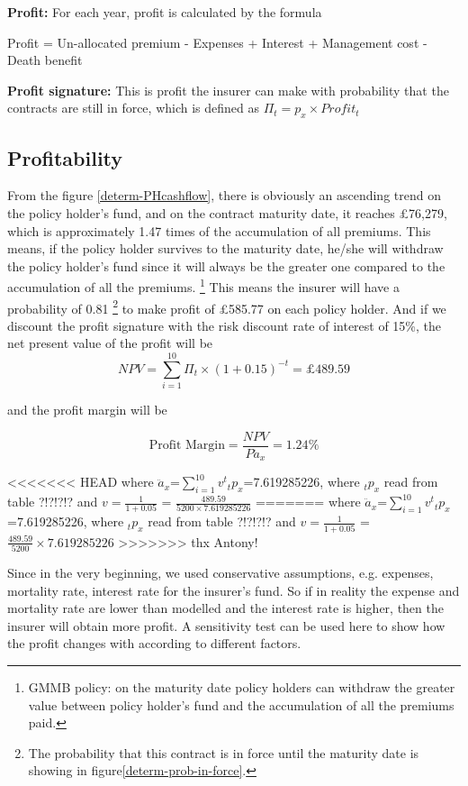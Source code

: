\documentclass{report}
\begin{document}
\textbf{Profit:} For each year, profit is calculated by the formula

Profit = Un-allocated premium - Expenses + Interest + Management cost - Death benefit

\textbf{Profit signature:} This is profit the insurer can make with probability that the contracts are still in force, which is defined as $\Pi_t = p_x \times Profit_t$


\subsection{Profitability}


From the figure \ref{determ-PHcashflow}, there is obviously an ascending trend on the policy holder's fund, and on the contract maturity date, it reaches \pounds 76,279, which is approximately 1.47 times of the accumulation of all premiums. This means, if the policy holder survives to the maturity date, he/she will withdraw the policy holder's fund since it will always be the greater one compared to the accumulation of all the premiums. \footnote{GMMB policy: on the maturity date policy holders can withdraw the greater value between policy holder's fund and the accumulation of all the premiums paid.} This means the insurer will have a probability of 0.81 \footnote{The probability that this contract is in force until the maturity date is showing in figure\ref{determ-prob-in-force}.} to make profit of \pounds 585.77 on each policy holder. And if we discount the profit signature with the risk discount rate of interest of 15\%, the net present value of the profit will be 
\[
 NPV=\sum_{i=1}^{10} \Pi_t \times (1+0.15)^{-t} = \pounds 489.59
\]
 
and the profit margin will be


\[
\text{Profit\ Margin} =  \frac{NPV}{P \ddot{a}_x} = 1.24\%
\]

<<<<<<< HEAD
where $\ddot{a}_x$=$\sum_{i=1}^{10} v^t {_tp_x}$=7.619285226, where $_tp_x$
read from table ?!?!?!? and $v=\frac{1}{1+0.05}$  = $\frac{489.59}{5200 \times
7.619285226}$
=======
where $\ddot{a}_x$=$\sum_{i=1}^{10} v^t {_tp_x}$=7.619285226, where $_tp_x$ read from table ?!?!?!? and $v=\frac{1}{1+0.05}$  = $\frac{489.59}{5200} \times 7.619285226$
>>>>>>> thx Antony!

Since in the very beginning, we used conservative assumptions, e.g. expenses, mortality rate, interest rate for the insurer's fund. So if in reality the expense and mortality rate are lower than modelled and the interest rate is higher, then the insurer will obtain more profit. A sensitivity test can be used here to show how the profit changes with according to different factors. 
\end{document}
